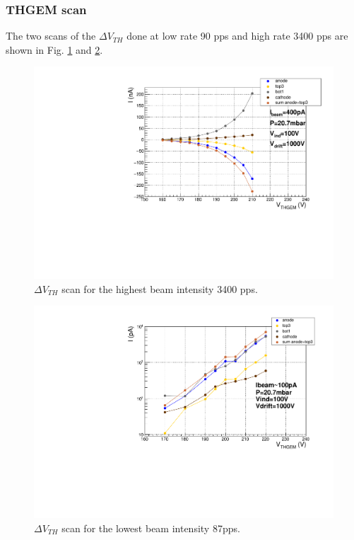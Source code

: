 \documentclass[a4paper, 11 pt]{report}
\newcommand{\Vthgem}{$\Delta V_{TH}$}
\begin{document}
  \subsubsection{THGEM scan}
  The two scans of the \Vthgem{} done at low rate 90 pps and high rate 3400 pps are shown in Fig. \ref{fig:driftScan_withBeam_H} and \ref{fig:driftScan_withBeam_L}.
  \begin{figure}[htbp]
	\centering
	\includegraphics[width=\textwidth]
	{Immagini/thgemScan_THGEM10_20mbar-Vdrift1000V-2020-03-09.pdf}
	\caption{\Vthgem{} scan for the highest beam intensity 3400 pps. }
	\label{fig:driftScan_withBeam_H}
  \end{figure}
  \begin{figure}[htbp]
	\centering
	\includegraphics[width=\textwidth]
	{Immagini/thgemScan_THGEM10_20mbar_109pA-Vdrift1000V-2020-03-09_logscale.pdf}
	\caption{\Vthgem{} scan for the lowest beam intensity 87pps.}
	\label{fig:driftScan_withBeam_L}
  \end{figure}
\end{document}
